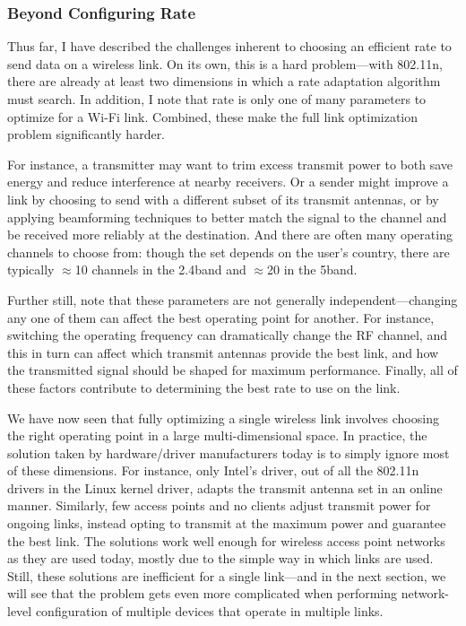 \subsubsection{Beyond Configuring Rate}
Thus far, I have described the challenges inherent to choosing an efficient rate to send data on a wireless link. On its own, this is a hard problem---with 802.11n, there are already at least two dimensions in which a rate adaptation algorithm must search. In addition, I note that rate is only one of many parameters to optimize for a Wi-Fi link. Combined, these make the full link optimization problem significantly harder.

For instance, a transmitter may want to trim excess transmit power to both save energy and reduce interference at nearby receivers. Or a sender might improve a link by choosing to send with a different subset of its transmit antennas, or by applying beamforming techniques to better match the signal to the channel and be received more reliably at the destination. And there are often many operating channels to choose from: though the set depends on the user's country, there are typically $\approx$10 channels in the 2.4\GHz band and $\approx$20 in the 5\GHz band.

Further still, note that these parameters are not generally independent---changing any one of them can affect the best operating point for another. For instance, switching the operating frequency can dramatically change the RF channel, and this in turn can affect which transmit antennas provide the best link, and how the transmitted signal should be shaped for maximum performance. Finally, all of these factors contribute to determining the best rate to use on the link.

We have now seen that fully optimizing a single wireless link involves choosing the right operating point in a large multi-dimensional space. In practice, the solution taken by hardware/driver manufacturers today is to simply ignore most of these dimensions. For instance, only Intel's  driver, out of all the 802.11n drivers in the Linux kernel driver, adapts the transmit antenna set in an online manner. Similarly, few access points and no clients adjust transmit power for ongoing links, instead opting to transmit at the maximum power and guarantee the best link. The solutions work well enough for wireless access point networks as they are used today, mostly due to the simple way in which links are used. Still, these solutions are inefficient for a single link---and in the next section, we will see that the problem gets even more complicated when performing network-level configuration of multiple devices that operate in multiple links.

